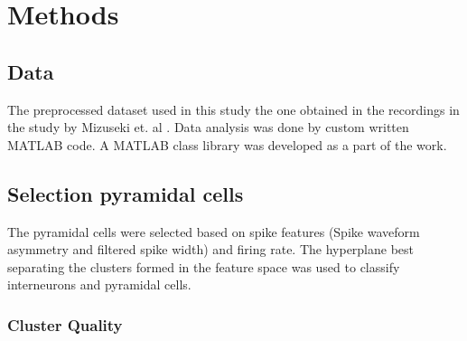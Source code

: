 \chapter{Methods}
\label{analysis}

\section{Data}
The preprocessed dataset used in this study the one obtained in the recordings in the study by Mizuseki et. al \cite{Mizuseki2012}. Data analysis was done by  custom written MATLAB code. A MATLAB class library was developed as a part of the work. 

\section{Selection pyramidal cells}
The pyramidal cells were selected based on spike features (Spike waveform asymmetry and filtered spike width) \cite{Sirota2008} and firing rate. The hyperplane best separating the clusters formed in the feature space was used to classify interneurons and pyramidal cells.

\subsection{Cluster Quality}


